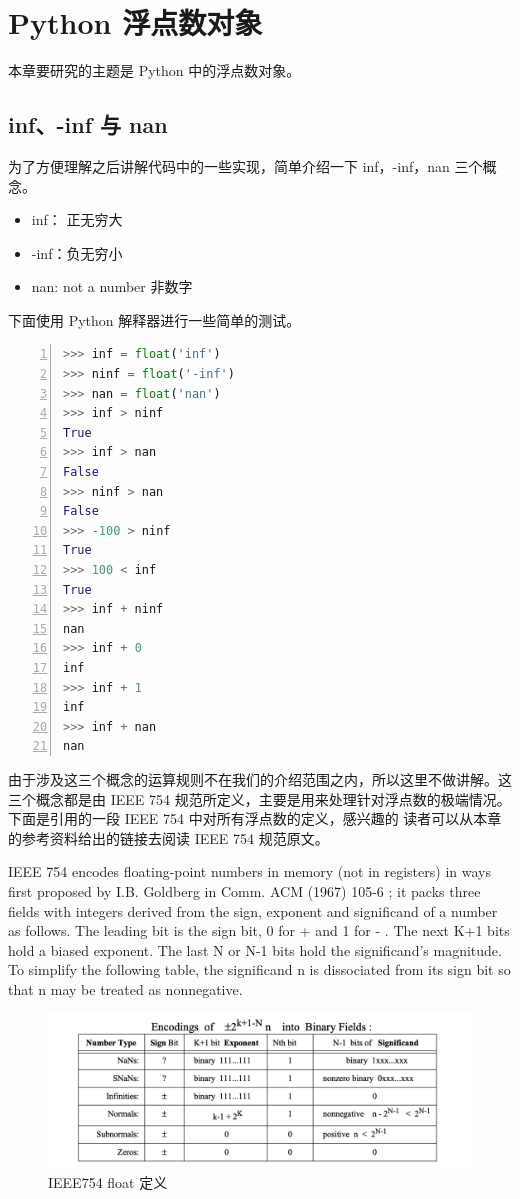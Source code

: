 \chapter{Python 浮点数对象}

本章要研究的主题是 Python 中的浮点数对象。

\section{inf、-inf 与 nan}
为了方便理解之后讲解代码中的一些实现，简单介绍一下 inf，-inf，nan 三个概念。
\begin{itemize}
\item inf： 正无穷大
\item -inf：负无穷小
\item nan: not a number 非数字
\end{itemize}

下面使用 Python 解释器进行一些简单的测试。

\begin{lstlisting}[language=Python, numbers=left, numbersep=1em, numberstyle=\footnotesize , breaklines=true]
>>> inf = float('inf')
>>> ninf = float('-inf')
>>> nan = float('nan')
>>> inf > ninf
True
>>> inf > nan
False
>>> ninf > nan
False
>>> -100 > ninf
True
>>> 100 < inf
True
>>> inf + ninf
nan
>>> inf + 0
inf
>>> inf + 1
inf
>>> inf + nan
nan
\end{lstlisting}

由于涉及这三个概念的运算规则不在我们的介绍范围之内，所以这里不做讲解。这三个概念都是由
IEEE 754 规范所定义，主要是用来处理针对浮点数的极端情况。下面是引用的一段 IEEE 754 中对所有浮点数的定义，感兴趣的
读者可以从本章的参考资料给出的链接去阅读 IEEE 754 规范原文。

IEEE 754 encodes floating-point numbers in memory (not in registers) in ways first proposed by I.B. Goldberg
in Comm. ACM (1967) 105-6 ; it packs three fields with integers derived from the sign, exponent and significand
of a number as follows. The leading bit is the sign bit, 0 for + and 1 for - . The next K+1 bits hold a biased
exponent. The last N or N-1 bits hold the significand's magnitude. To simplify the following table, the
significand n is dissociated from its sign bit so that n may be treated as nonnegative.

\begin{figure}[htbp]
\centering
  \includegraphics[width=1.0\textwidth]{pictures/inf_and_nan.png}
  \caption{IEEE754 float 定义 \label{fig:scatter}}
\end{figure}

